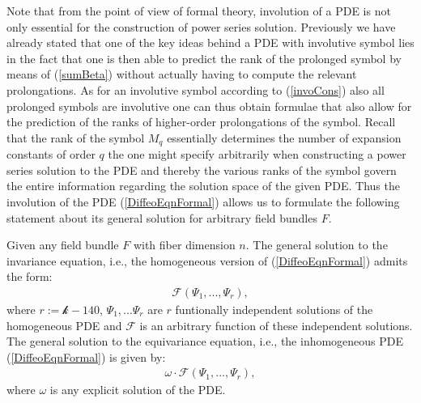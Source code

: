 Note that from the point of view of formal theory, involution of a PDE is not only essential for the construction of power series solution. Previously we have already stated that one of the key ideas behind a PDE with involutive symbol lies in the fact that one is then able to predict the rank of the prolonged symbol by means of (\ref{sumBeta}) without actually having to compute the relevant prolongations. As for an involutive symbol according to (\ref{invoCons}) also all prolonged symbols are involutive one can thus obtain formulae that also allow for the prediction of the ranks of higher-order prolongations of the symbol. Recall that the rank of the symbol $M_q$ essentially determines the number of expansion constants of order $q$ the one might specify arbitrarily when constructing a power series solution to the PDE  and thereby the various ranks of the symbol govern the entire information regarding the solution space of the given PDE.
Thus the involution of the PDE (\ref{DiffeoEqnFormal}) allows us to formulate the following statement about its general solution for arbitrary field bundles $F$.
\begin{theorem}\label{GeneralSol}
Given any field bundle $F$ with fiber dimension $n$. The general solution to the invariance equation, i.e., the homogeneous version of (\ref{DiffeoEqnFormal}) admits the form:
\begin{align}
    \mathcal{F} \left (\Psi_1,...,\Psi_r \right ),
\end{align}
where $r:=\mathcal{k}-140$, $\Psi_1,...\Psi_r$ are $r$ funtionally independent solutions of the homogeneous PDE and $\mathcal{F}$ is an arbitrary function of these independent solutions. The general solution to the equivariance equation, i.e., the inhomogeneous PDE (\ref{DiffeoEqnFormal}) is given by:
\begin{align}
    \omega \cdot \mathcal{F} \left (\Psi_1,...,\Psi_r \right ),
\end{align}
where $\omega$ is any explicit solution of the PDE. 
\end{theorem}
